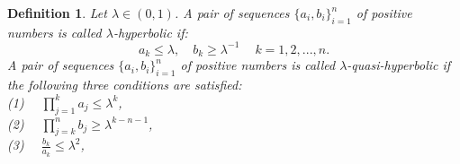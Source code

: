 \documentclass[12pt]{article}
\newtheorem{definition}{Definition}[section]
\begin{document}
\begin{definition}

Let $ \lambda\in (0,1) $. A pair of sequences $\{a_{i},b_{i}\}_{i=1}^{n}  $ of positive numbers is called $ \lambda$-hyperbolic if:
$$
a_{k}\leqslant\lambda,\quad b_{k}\geqslant \lambda^{-1} \quad \  k=1,2,...,n.
$$
A pair of sequences $\{a_{i},b_{i}\}_{i=1}^{n}  $ of positive numbers is called $ \lambda $-quasi-hyperbolic if the following three conditions are satisfied:\\
(1) $ \quad \prod_{j=1}^{k} a_{j}\leqslant \lambda^{k}  $,\\
(2) $ \quad \prod_{j=k}^{n} b_{j}\geqslant \lambda^{k-n-1}  $,\\
(3) $ \quad \frac{b_{k}}{a_{k}}\leqslant\lambda^{2}   $,\\                                                                                                                                                                                                                                                                                                                                                                                                                                                                                                                                                                                                                                                                                                                                                                                                                                                                                                                                                                                                                                                                                                                                                                                                                                                                                                                                                                                                                                                                                                                                                                                                                                                                                                                                                                                                                                                                                                                                                                                                                                                                                                                                                                                                                                                                                                                                                                                                                                                                                                                                                                                                            
\end{definition}
\end{document}
